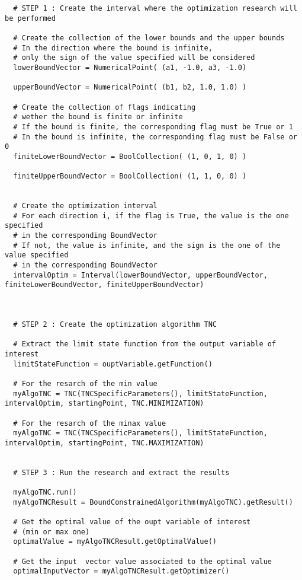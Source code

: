 \begin{lstlisting}
  # STEP 1 : Create the interval where the optimization research will be performed

  # Create the collection of the lower bounds and the upper bounds
  # In the direction where the bound is infinite,
  # only the sign of the value specified will be considered
  lowerBoundVector = NumericalPoint( (a1, -1.0, a3, -1.0)

  upperBoundVector = NumericalPoint( (b1, b2, 1.0, 1.0) )

  # Create the collection of flags indicating
  # wether the bound is finite or infinite
  # If the bound is finite, the corresponding flag must be True or 1
  # In the bound is infinite, the corresponding flag must be False or 0
  finiteLowerBoundVector = BoolCollection( (1, 0, 1, 0) )

  finiteUpperBoundVector = BoolCollection( (1, 1, 0, 0) )


  # Create the optimization interval
  # For each direction i, if the flag is True, the value is the one specified
  # in the corresponding BoundVector
  # If not, the value is infinite, and the sign is the one of the value specified
  # in the corresponding BoundVector
  intervalOptim = Interval(lowerBoundVector, upperBoundVector, finiteLowerBoundVector, finiteUpperBoundVector)



  # STEP 2 : Create the optimization algorithm TNC

  # Extract the limit state function from the output variable of interest
  limitStateFunction = ouptVariable.getFunction()

  # For the resarch of the min value
  myAlgoTNC = TNC(TNCSpecificParameters(), limitStateFunction, intervalOptim, startingPoint, TNC.MINIMIZATION)

  # For the resarch of the minax value
  myAlgoTNC = TNC(TNCSpecificParameters(), limitStateFunction, intervalOptim, startingPoint, TNC.MAXIMIZATION)


  # STEP 3 : Run the research and extract the results

  myAlgoTNC.run()
  myAlgoTNCResult = BoundConstrainedAlgorithm(myAlgoTNC).getResult()

  # Get the optimal value of the oupt variable of interest
  # (min or max one)
  optimalValue = myAlgoTNCResult.getOptimalValue()

  # Get the input  vector value associated to the optimal value
  optimalInputVector = myAlgoTNCResult.getOptimizer()
\end{lstlisting}



